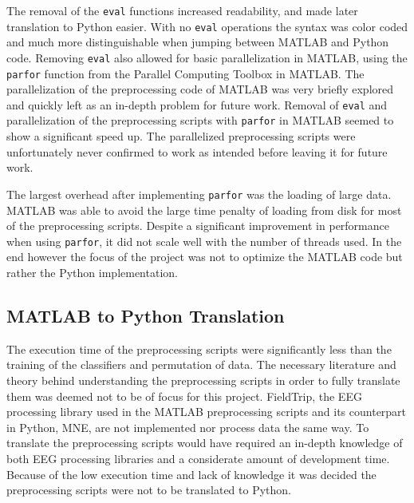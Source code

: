 \documentclass[12pt, a4paper]{article}
\begin{document}
The removal of the \texttt{eval} functions increased readability, and made later translation to Python easier.
With no \texttt{eval} operations the syntax was color coded and much more distinguishable when jumping between MATLAB and Python code.
Removing \texttt{eval} also allowed for basic parallelization in MATLAB, using the \texttt{parfor} function from the Parallel Computing Toolbox in MATLAB.
The parallelization of the preprocessing code of MATLAB was very briefly explored and quickly left as an in-depth problem for future work.
Removal of \texttt{eval} and parallelization of the preprocessing scripts with \texttt{parfor} in MATLAB seemed to show a significant speed up.
The parallelized preprocessing scripts were unfortunately never confirmed to work as intended before leaving it for future work.

The largest overhead after implementing \texttt{parfor} was the loading of large data. 
MATLAB was able to avoid the large time penalty of loading from disk for most of the preprocessing scripts.
Despite a significant improvement in performance when using \texttt{parfor}, it did not scale well with the number of threads used.
In the end however the focus of the project was not to optimize the MATLAB code but rather the Python implementation.


\subsection{MATLAB to Python Translation}\label{MATPYConv}

The execution time of the preprocessing scripts were significantly less than the training of the classifiers and permutation of data. 
The necessary literature and theory behind understanding the preprocessing scripts in order to fully translate them was deemed not to be of focus for this project.
FieldTrip, the EEG processing library used in the MATLAB preprocessing scripts and its counterpart in Python, MNE, are not implemented nor process data the same way.
To translate the preprocessing scripts would have required an in-depth knowledge of both EEG processing libraries and a considerate amount of development time.
Because of the low execution time and lack of knowledge it was decided the preprocessing scripts were not to be translated to Python.
\end{document}

